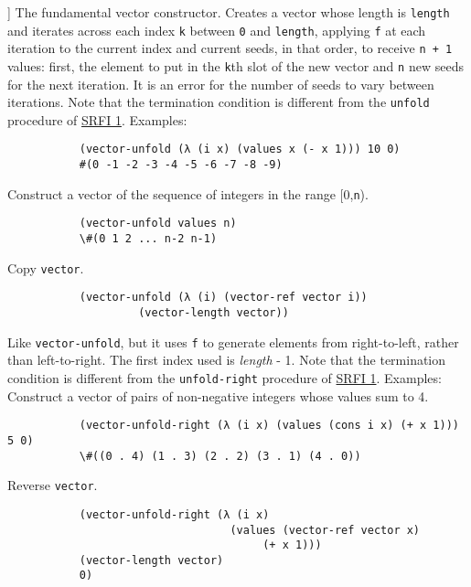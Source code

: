 \begin{entry}{%
  }

 ] The fundamental vector constructor. Creates a vector
  whose length is \texttt{length} and iterates across each index
  \texttt{k} between \texttt{0} and \texttt{length}, applying
  \texttt{f} at each iteration to the current index and current seeds,
  in that order, to receive \texttt{n\ +\ 1} values: first, the
  element to put in the \texttt{k}th slot of the new vector and
  \texttt{n} new seeds for the next iteration.  It is an error for the
  number of seeds to vary between iterations. Note that the
  termination condition is different from the \texttt{unfold}
  procedure of \protect\hyperlink{SRFIux5cux25201}{SRFI 1}.  Examples:
\begin{verbatim}
           (vector-unfold (λ (i x) (values x (- x 1))) 10 0)         
           #(0 -1 -2 -3 -4 -5 -6 -7 -8 -9)         
\end{verbatim}
  Construct
  a vector of the sequence of integers in the range {[}0,\texttt{n}).\\
\begin{verbatim}
           (vector-unfold values n)         
           \#(0 1 2 ... n-2 n-1)         
\end{verbatim}
  Copy \texttt{vector}.
\begin{verbatim}
           (vector-unfold (λ (i) (vector-ref vector i))           
                    (vector-length vector))         
\end{verbatim}
\end{entry}

\begin{entry}{%
  }

  Like \texttt{vector-unfold}, but it uses
  \texttt{f} to generate elements from right-to-left, rather than
  left-to-right. The first index used is \emph{length} - 1. Note that
  the termination condition is different from the
  \texttt{unfold-right} procedure of
  \protect\hyperlink{SRFIux5cux25201}{SRFI 1}.  Examples: Construct a
  vector of pairs of non-negative integers whose values sum to 4.
\begin{verbatim}
           (vector-unfold-right (λ (i x) (values (cons i x) (+ x 1))) 5 0)         
           \#((0 . 4) (1 . 3) (2 . 2) (3 . 1) (4 . 0))         
\end{verbatim}
  Reverse \texttt{vector}.
\begin{verbatim}
           (vector-unfold-right (λ (i x)
                                  (values (vector-ref vector x)   
                                       (+ x 1)))
           (vector-length vector)
           0)         
\end{verbatim}
\end{entry}

